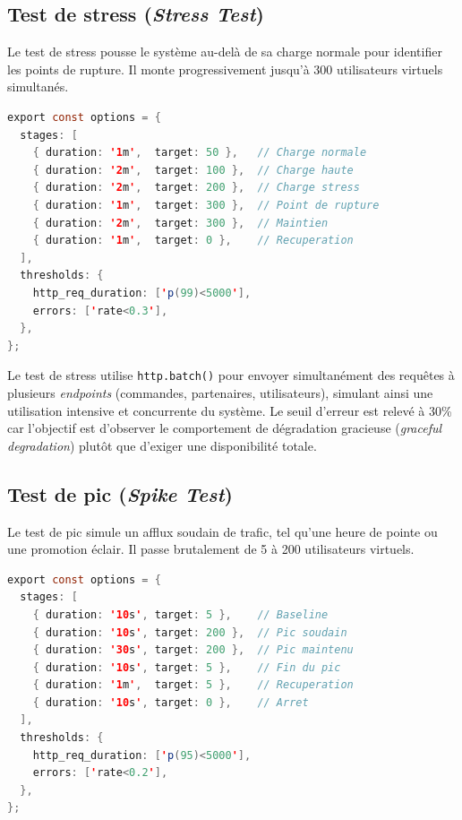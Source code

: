 \subsection{Test de stress (\textit{Stress Test})}
\label{subsec:test-stress}

Le test de stress pousse le système au-delà de sa charge normale pour identifier les
points de rupture. Il monte progressivement jusqu'à 300 utilisateurs virtuels simultanés.

\begin{lstlisting}[language=Java, caption={Configuration du test de stress -- k6-stress-test.js}, label={lst:k6-stress-test}]
export const options = {
  stages: [
    { duration: '1m',  target: 50 },   // Charge normale
    { duration: '2m',  target: 100 },  // Charge haute
    { duration: '2m',  target: 200 },  // Charge stress
    { duration: '1m',  target: 300 },  // Point de rupture
    { duration: '2m',  target: 300 },  // Maintien
    { duration: '1m',  target: 0 },    // Recuperation
  ],
  thresholds: {
    http_req_duration: ['p(99)<5000'],
    errors: ['rate<0.3'],
  },
};
\end{lstlisting}

Le test de stress utilise \texttt{http.batch()} pour envoyer simultanément des requêtes
à plusieurs \textit{endpoints} (commandes, partenaires, utilisateurs), simulant ainsi
une utilisation intensive et concurrente du système. Le seuil d'erreur est relevé à 30\%
car l'objectif est d'observer le comportement de dégradation gracieuse (\textit{graceful
degradation}) plutôt que d'exiger une disponibilité totale.

\subsection{Test de pic (\textit{Spike Test})}
\label{subsec:test-spike}

Le test de pic simule un afflux soudain de trafic, tel qu'une heure de pointe ou une
promotion éclair. Il passe brutalement de 5 à 200 utilisateurs virtuels.

\begin{lstlisting}[language=Java, caption={Configuration du test de pic -- k6-spike-test.js}, label={lst:k6-spike-test}]
export const options = {
  stages: [
    { duration: '10s', target: 5 },    // Baseline
    { duration: '10s', target: 200 },  // Pic soudain
    { duration: '30s', target: 200 },  // Pic maintenu
    { duration: '10s', target: 5 },    // Fin du pic
    { duration: '1m',  target: 5 },    // Recuperation
    { duration: '10s', target: 0 },    // Arret
  ],
  thresholds: {
    http_req_duration: ['p(95)<5000'],
    errors: ['rate<0.2'],
  },
};
\end{lstlisting}

